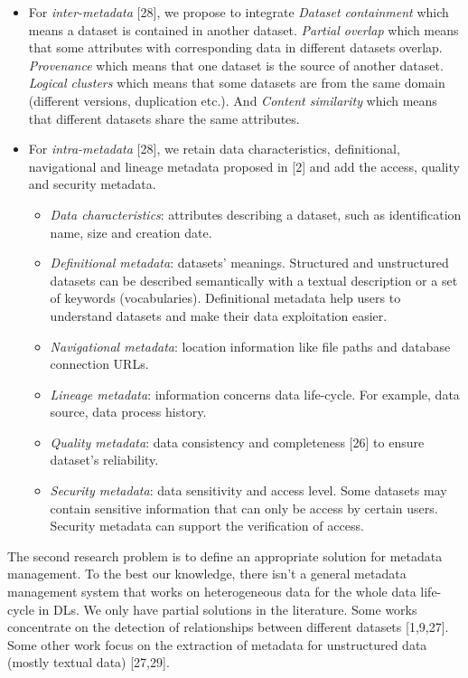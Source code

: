 \documentclass[a4paper,12pt,notitlepage,twoside,openright]{article}
\begin{document}
\begin{itemize}
\item
  For \emph{inter-metadata} {[}28{]}, we propose to integrate
  \emph{Dataset containment} which means a dataset is contained in
  another dataset. \emph{Partial overlap} which means that some
  attributes with corresponding data in different datasets overlap.
  \emph{Provenance} which means that one dataset is the source of
  another dataset. \emph{Logical clusters} which means that some
  datasets are from the same domain (different versions, duplication
  etc.). And \emph{Content similarity} which means that different
  datasets share the same attributes.
\item
  For \emph{intra-metadata} {[}28{]}, we retain data characteristics,
  definitional, navigational and lineage metadata proposed in {[}2{]}
  and add the access, quality and security metadata.

  \begin{itemize}
  \item
    \emph{Data characteristics}: attributes describing a dataset, such
    as identification name, size and creation date.
  \item
    \emph{Definitional metadata}: datasets' meanings. Structured and
    unstructured datasets can be described semantically with a textual
    description or a set of keywords (vocabularies). Definitional
    metadata help users to understand datasets and make their data
    exploitation easier.
  \item
    \emph{Navigational metadata}: location information like file paths
    and database connection URLs.
  \item
    \emph{Lineage metadata}: information concerns data life-cycle. For
    example, data source, data process history.
  \item
    \emph{Quality metadata}: data consistency and completeness {[}26{]}
    to ensure dataset's reliability.
  \item
    \emph{Security metadata}: data sensitivity and access level. Some
    datasets may contain sensitive information that can only be access
    by certain users. Security metadata can support the verification of
    access.
  \end{itemize}
\end{itemize}

The second research problem is to define an appropriate solution for
metadata management. To the best our knowledge, there isn't a general
metadata management system that works on heterogeneous data for the
whole data life-cycle in DLs. We only have partial solutions in the
literature. Some works concentrate on the detection of relationships
between different datasets {[}1,9,27{]}. Some other work focus on the
extraction of metadata for unstructured data (mostly textual data)
{[}27,29{]}.
\end{document}
